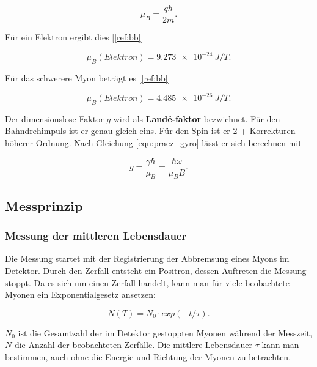 \documentclass[a4paper,ngerman]{scrartcl}
\begin{document}
\begin{equation}
\mu_B = \frac{q\hbar}{2 m} .
\end{equation}


Für ein Elektron ergibt dies [\ref{ref:bb}]

\begin{equation}
\mu_B (Elektron) = \SI{9.273e-24}{ J/T } .
\end{equation}

Für das schwerere Myon beträgt es [\ref{ref:bb}]

\begin{equation}
\mu_B (Elektron) = \SI{4.485e-26}{ J/T } .
\end{equation} 


Der dimensionslose Faktor $g$ wird als \textbf{Landé-faktor} bezwichnet. Für den Bahndrehimpuls ist er genau gleich eins. Für den Spin ist er 2 + Korrekturen höherer Ordnung. Nach Gleichung \ref{eqn:praez_gyro} lässt er sich berechnen mit

\begin{equation}
g = \frac{\gamma \hbar}{\mu_B} = \frac{\hbar \omega}{\mu_B B} .
\end{equation}


\subsection{Messprinzip}
\label{sec:messprinzip}

\subsubsection*{Messung der mittleren Lebensdauer}

Die Messung startet mit der Registrierung der Abbremsung eines Myons im Detektor. Durch den Zerfall entsteht ein Positron, dessen Auftreten die Messung stoppt. Da es sich um einen Zerfall handelt, kann man für viele beobachtete Myonen ein Exponentialgesetz ansetzen:

\begin{equation}
\label{eqn:messprinzip-zerfall}
N(T) = N_0 \cdot exp(-t / \tau) .
\end{equation} 
	
$N_0$ ist die Gesamtzahl der im Detektor gestoppten Myonen während der Messzeit, $N$ die Anzahl der beobachteten Zerfälle.
Die mittlere Lebensdauer $\tau$ kann man bestimmen, auch ohne die Energie und Richtung der Myonen zu betrachten. 
\end{document}
